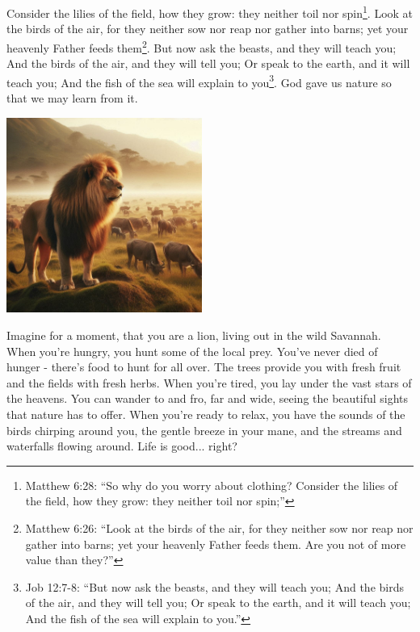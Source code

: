 \documentclass[10pt]{article}
\begin{document}
\begin{multicols}{2}


Consider the lilies of the field, how they grow: they neither toil nor spin\footnote{Matthew 6:28: ``So why do you worry about clothing? Consider the lilies of the field, how they grow: they neither toil nor spin;''}. Look at the birds of the air, for they neither sow nor reap nor gather into barns; yet your heavenly Father feeds them\footnote{Matthew 6:26: ``Look at the birds of the air, for they neither sow nor reap nor gather into barns; yet your heavenly Father feeds them. Are you not of more value than they?''}. But now ask the beasts, and they will teach you; And the birds of the air, and they will tell you; Or speak to the earth, and it will teach you; And the fish of the sea will explain to you\footnote{Job 12:7-8: ``But now ask the beasts, and they will teach you; And the birds of the air, and they will tell you; Or speak to the earth, and it will teach you; And the fish of the sea will explain to you.''}. God gave us nature so that we may learn from it.

\begin{center}
	\includegraphics[width=0.48\textwidth]{lion.jpeg}
\end{center}

Imagine for a moment, that you are a lion, living out in the wild Savannah. When you're hungry, you hunt some of the local prey. You've never died of hunger - there's food to hunt for all over. The trees provide you with fresh fruit and the fields with fresh herbs. When you're tired, you lay under the vast stars of the heavens. You can wander to and fro, far and wide, seeing the beautiful sights that nature has to offer. When you're ready to relax, you have the sounds of the birds chirping around you, the gentle breeze in your mane, and the streams and waterfalls flowing around. Life is good... right?


\end{multicols}
\end{document}

